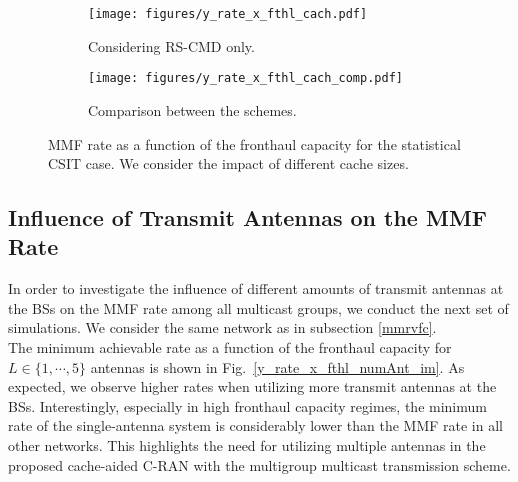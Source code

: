 \documentclass[12pt,draftcls,onecolumn]{IEEEtran}
\theoremstyle{remark}
\theoremstyle{definition}
\begin{document}
{%
\begin{figure}
	\centering
	\begin{subfigure}[t]{0.49\textwidth}
		\centering
		\texttt{[image: figures/y\_rate\_x\_fthl\_cach.pdf]}
		\caption{Considering RS-CMD only.}
		\label{y_rate_x_fthl_cach_im}
	\end{subfigure}\hfill
	\begin{subfigure}[t]{0.49\textwidth}
		\centering
		\texttt{[image: figures/y\_rate\_x\_fthl\_cach\_comp.pdf]}
		\caption{Comparison between the schemes.}
		\label{y_rate_x_fthl_cach_comp_im}
	\end{subfigure}
	\caption{MMF rate as a function of the fronthaul capacity for the statistical CSIT case. We consider the impact of different cache sizes.}
	\label{y_rate_x_fthl_para_im}
\end{figure}

\subsection{Influence of Transmit Antennas on the MMF Rate}
In order to investigate the influence of different amounts of transmit antennas at the BSs on the MMF rate among all multicast groups, we conduct the next set of simulations. We consider the same network as in subsection \ref{mmrvfc}. \\ %
\indent The minimum achievable rate as a function of the fronthaul capacity for $L \in \{1,\cdots,5\}$ antennas is shown in Fig.~\ref{y_rate_x_fthl_numAnt_im}. As expected, we observe higher rates when utilizing more transmit antennas at the BSs. Interestingly, especially in high fronthaul capacity regimes, the minimum rate of the single-antenna system is considerably lower than the MMF rate in all other networks. This highlights the need for utilizing multiple antennas in the proposed cache-aided C-RAN with the multigroup multicast transmission scheme.

}
\end{document}
